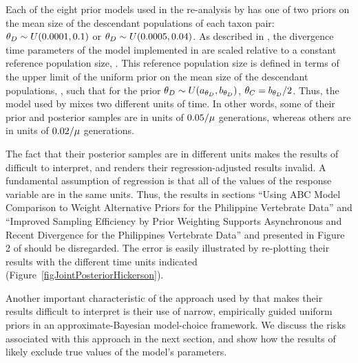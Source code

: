 Each of the eight prior models used in the re-analysis by \citet{Hickerson2013}
has one of two priors on the mean size of the descendant populations of each
taxon pair:
$\meanDescendantTheta{} \sim U(0.0001, 0.1)$ or
$\meanDescendantTheta{} \sim U(0.0005, 0.04)$.
As described in \citet{Oaks2012}, the divergence time parameters of the model
implemented in \msb are scaled relative to a constant reference population
size, .
This reference population size is defined in terms of the upper limit of the
uniform prior on the mean size of the descendant populations,
\meanDescendantTheta{}, such that for the prior $\meanDescendantTheta{} \sim
U(\uniformMin{\meanDescendantTheta{}},\uniformMax{\meanDescendantTheta{}})$,
$\myTheta{C} = \uniformMax{\meanDescendantTheta{}}/2$.
Thus, the model used by \citet{Hickerson2013} mixes two different units of
time.
In other words, some of their prior and posterior samples are in units of
$0.05/\mu$ generations, whereas others are in units of
$0.02/\mu$ generations.

The fact that their posterior samples are in different units makes the results
of \citet{Hickerson2013} difficult to interpret, and renders their
regression-adjusted results invalid.
A fundamental assumption of regression is that all of the values of the
response variable are in the same units.
Thus, the results in sections ``Using ABC Model Comparison to Weight
Alternative Priors for the Philippine Vertebrate Data'' and ``Improved Sampling
Efficiency by Prior Weighting Supports Asynchronous and Recent Divergence for
the Philippines Vertebrate Data'' and presented in Figure 2 of
\citet{Hickerson2013} should be disregarded.
The error is easily illustrated by re-plotting their results with the different
time units indicated (Figure~\ref{figJointPosteriorHickerson}).

Another important characteristic of the approach used by \citet{Hickerson2013}
that makes their results difficult to interpret is their use of narrow,
empirically guided uniform priors in an approximate-Bayesian model-choice
framework.
We discuss the risks associated with this approach in the next section, and
show how the results of \citet{Hickerson2013} likely exclude true values of the
model's parameters.



